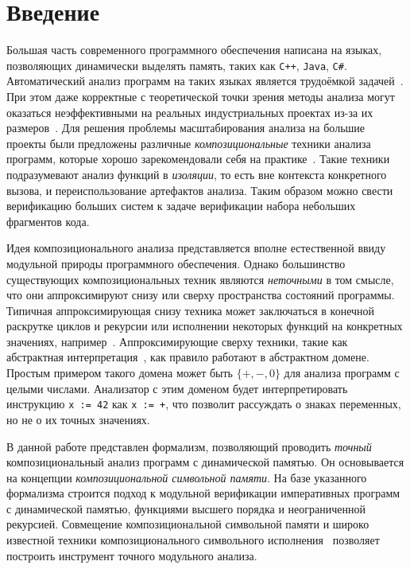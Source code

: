\section{Введение}

Большая часть современного программного обеспечения написана на языках, позволяющих  динамически выделять память, таких как \texttt{C++}, \texttt{Java}, \texttt{C\#}. Автоматический анализ программ на таких языках является трудоёмкой задачей~\cite{distefano2009attacking}. При этом даже корректные с теоретической точки зрения методы анализа могут оказаться неэффективными на реальных индустриальных проектах из-за их размеров~\cite{calcagno2011compositional}. Для решения проблемы масштабирования анализа на большие проекты были предложены различные \emph{композициональные} техники анализа программ, которые хорошо зарекомендовали себя на практике~\cite{gurfinkel2015seahorn,anand2008demand,distefano2008jstar,calcagno2011infer}. Такие техники подразумевают анализ функций в \emph{изоляции}, то есть вне контекста конкретного вызова, и переиспользование артефактов анализа. Таким образом можно свести верификацию больших систем к задаче верификации набора небольших фрагментов кода.

Идея композиционального анализа представляется вполне естественной ввиду модульной природы программного обеспечения. Однако большинство существующих композициональных техник являются \emph{неточными} в том смысле, что они аппроксимируют снизу или сверху пространства состояний программы. Типичная аппроксимирующая снизу техника может заключаться в конечной раскрутке циклов и рекурсии или исполнении некоторых функций на конкретных значениях, например~\cite{tillmann2008pex}. Аппроксимирующие сверху техники, такие как абстрактная интерпретация~\cite{cousot1977abstract}, как правило работают в абстрактном домене. Простым примером такого домена может быть $\{+, -, 0\}$ для анализа программ с целыми числами. Анализатор с этим доменом будет интерпретировать инструкцию \lstinline{x := 42} как \lstinline{x := +}, что позволит рассуждать о знаках переменных, но не о их точных значениях.

В данной работе представлен формализм, позволяющий проводить \emph{точный} композициональный анализ программ с динамической памятью. Он основывается на концепции \emph{композициональной символьной памяти}. На базе указанного формализма строится подход к модульной верификации императивных программ с динамической памятью, функциями высшего порядка и неограниченной рекурсией. Совмещение композициональной символьной памяти и широко известной техники композиционального символьного исполнения~\cite{godefroid2007compositional} позволяет построить инструмент точного модульного анализа.

